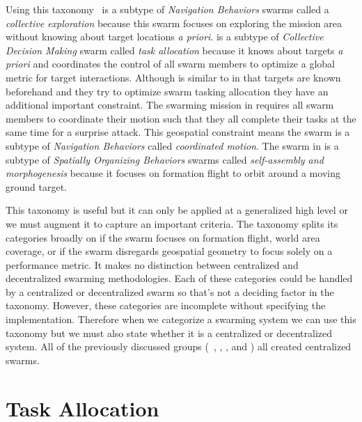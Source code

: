 Using this taxonomy~\citet{jin} is a subtype of \textit{Navigation Behaviors} swarms called a \textit{collective exploration} because this swarm focuses on exploring the mission area without knowing about target locations \textit{a priori}.  \citet{bellingham} is a subtype of \textit{Collective Decision Making} swarm called \textit{task allocation}  because it knows about targets \textit{a priori} and coordinates the control of all swarm members to optimize a global metric for target interactions.  Although \citet{beard} is similar to \citet{bellingham} in that targets are known beforehand and they try to optimize swarm tasking allocation they have an additional important constraint.  The swarming mission in \citet{beard} requires all swarm members to coordinate their motion such that they all complete their tasks at the same time for a surprise attack. This geospatial constraint means the swarm is a subtype of \textit{Navigation Behaviors} called \textit{coordinated motion}.  The swarm in \citet{wheeler} is a subtype of \textit{Spatially Organizing Behaviors} swarms called \textit{self-assembly and morphogenesis} because it focuses on formation flight to orbit around a moving ground target. %

This taxonomy is useful but it can only be applied at a generalized high level or we must augment it to capture an important criteria.  The taxonomy splits its categories broadly on if the swarm focuses on formation flight, world area coverage, or if the swarm disregards geospatial geometry to focus solely on a performance metric.  It makes no distinction between centralized and decentralized swarming methodologies.  Each of these categories could be handled by a centralized or decentralized swarm so that's not a deciding factor in the taxonomy.  However, these categories are incomplete without specifying the implementation.  Therefore when we categorize a swarming system we can use this taxonomy but we must also state whether it is a centralized or decentralized system.  All of the previously discussed groups (~\citet{jin}, \citet{bellingham}, \citet{beard}, and \citet{wheeler})  all created centralized swarms.

\section{Task Allocation}
\label{sec:uncoordTaskingRelated}

